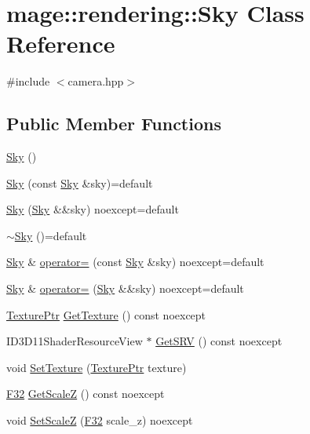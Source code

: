 \hypertarget{classmage_1_1rendering_1_1_sky}{}\section{mage\+:\+:rendering\+:\+:Sky Class Reference}
\label{classmage_1_1rendering_1_1_sky}


{\ttfamily \#include $<$camera.\+hpp$>$}

\subsection*{Public Member Functions}
\begin{DoxyCompactItemize}
\item 
\hyperlink{classmage_1_1rendering_1_1_sky_a9679ec331c5e0fc01c49760f6e74664d}{Sky} ()
\item 
\hyperlink{classmage_1_1rendering_1_1_sky_aeafa720fff92be3f02d484a47443b973}{Sky} (const \hyperlink{classmage_1_1rendering_1_1_sky}{Sky} \&sky)=default
\item 
\hyperlink{classmage_1_1rendering_1_1_sky_aa1484300b69e97812d73e0f5281d8bbc}{Sky} (\hyperlink{classmage_1_1rendering_1_1_sky}{Sky} \&\&sky) noexcept=default
\item 
\hyperlink{classmage_1_1rendering_1_1_sky_a948ac13394c361864f1da3dc27ab3326}{$\sim$\+Sky} ()=default
\item 
\hyperlink{classmage_1_1rendering_1_1_sky}{Sky} \& \hyperlink{classmage_1_1rendering_1_1_sky_a9654c598bd30fee1b0892b0abf7b7c96}{operator=} (const \hyperlink{classmage_1_1rendering_1_1_sky}{Sky} \&sky) noexcept=default
\item 
\hyperlink{classmage_1_1rendering_1_1_sky}{Sky} \& \hyperlink{classmage_1_1rendering_1_1_sky_a01b1145f77fdab81e7dce93f6a524b45}{operator=} (\hyperlink{classmage_1_1rendering_1_1_sky}{Sky} \&\&sky) noexcept=default
\item 
\hyperlink{namespacemage_1_1rendering_a6f3ae54f825328465b0cdde0f0de4a36}{Texture\+Ptr} \hyperlink{classmage_1_1rendering_1_1_sky_a575698f7fafad47d544f88bf4e2eea5e}{Get\+Texture} () const noexcept
\item 
I\+D3\+D11\+Shader\+Resource\+View $\ast$ \hyperlink{classmage_1_1rendering_1_1_sky_a8ded7262b242de3e76e4bdcd5a91f4c3}{Get\+S\+RV} () const noexcept
\item 
void \hyperlink{classmage_1_1rendering_1_1_sky_aca571c68ad345801051fcc36e32013e6}{Set\+Texture} (\hyperlink{namespacemage_1_1rendering_a6f3ae54f825328465b0cdde0f0de4a36}{Texture\+Ptr} texture)
\item 
\hyperlink{namespacemage_aa97e833b45f06d60a0a9c4fc22ae02c0}{F32} \hyperlink{classmage_1_1rendering_1_1_sky_a12023dbc7f9511152719cee35a84fc34}{Get\+ScaleZ} () const noexcept
\item 
void \hyperlink{classmage_1_1rendering_1_1_sky_a92fcaf3c89a39fd97a37ab61adf1c194}{Set\+ScaleZ} (\hyperlink{namespacemage_aa97e833b45f06d60a0a9c4fc22ae02c0}{F32} scale\+\_\+z) noexcept
\end{DoxyCompactItemize}
